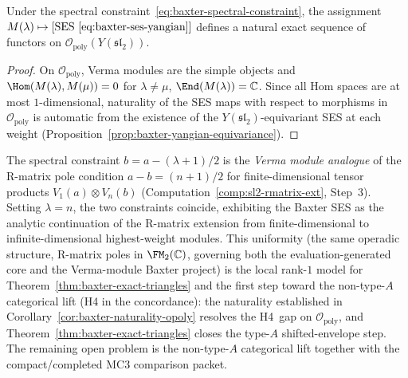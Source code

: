 \begin{corollary}
\label{cor:baxter-naturality-opoly}
Under the spectral
constraint~\eqref{eq:baxter-spectral-constraint}, the
assignment
$M(\lambda) \mapsto
[\textup{SES}~\eqref{eq:baxter-ses-yangian}]$
defines a natural exact sequence of functors on
$\mathcal{O}_{\mathrm{poly}}(Y(\mathfrak{sl}_2))$.
\end{corollary}

\begin{proof}
On $\mathcal{O}_{\mathrm{poly}}$, Verma modules are the simple
objects and $\Hom(M(\lambda), M(\mu)) = 0$ for $\lambda \neq \mu$,
$\End(M(\lambda)) = \mathbb{C}$. Since all Hom spaces are at most
$1$-dimensional, naturality of the SES maps with respect to
morphisms in $\mathcal{O}_{\mathrm{poly}}$ is automatic from the
existence of the $Y(\mathfrak{sl}_2)$-equivariant SES at each
weight
(Proposition~\ref{prop:baxter-yangian-equivariance}).
\end{proof}

\begin{remark}
\label{rem:rmatrix-baxter-connection}
The spectral constraint $b = a - (\lambda+1)/2$ is the
\emph{Verma module analogue} of the R-matrix pole condition
$a - b = (n+1)/2$ for finite-dimensional tensor products
$V_1(a) \otimes V_n(b)$
(Computation~\ref{comp:sl2-rmatrix-ext}, Step~3). Setting
$\lambda = n$, the two constraints coincide, exhibiting the Baxter
SES as the analytic continuation of the R-matrix extension from
finite-dimensional to infinite-dimensional highest-weight modules.
This uniformity (the same operadic structure, R-matrix poles in
$\FM_2(\mathbb{C})$, governing both the evaluation-generated core
and the Verma-module Baxter project) is the local rank-$1$ model for
Theorem~\ref{thm:baxter-exact-triangles} and the first step
toward the non-type-$A$ categorical lift (H4 in the concordance): the
naturality established in
Corollary~\ref{cor:baxter-naturality-opoly} resolves the
H4~gap on $\mathcal{O}_{\mathrm{poly}}$, and
Theorem~\ref{thm:baxter-exact-triangles} closes the type-$A$
shifted-envelope step. The remaining open problem is the non-type-$A$
categorical lift together with the compact/completed MC3 comparison
packet.
\end{remark}

